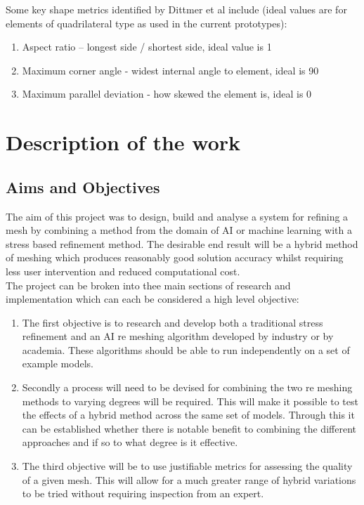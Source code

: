 \documentclass{article}
\begin{document}
\noindent
Some key shape metrics identified by Dittmer et al include (ideal values are for elements of quadrilateral type as used in  the current prototypes):

\begin{enumerate}[label=\Alph*]
\item Aspect ratio – longest side / shortest side, ideal value is 1
\item Maximum corner angle - widest internal angle to element, ideal is 90\degree
\item Maximum parallel deviation - how skewed the element is, ideal is 0\degree
\end{enumerate}

\section{Description of the work}
\subsection{Aims and Objectives}
The aim of this project was to design, build and analyse a system for refining a mesh by combining a method from the domain of AI or machine learning with a stress based refinement method. The desirable end result will be a hybrid method of meshing which produces reasonably good solution accuracy whilst requiring less user intervention and reduced computational cost.\\

\noindent
The project can be broken into thee main sections of research and implementation which can each be considered a high level objective:\\ 

\begin{enumerate}[label=\Alph*]

\item The first objective is to research and develop both a traditional stress refinement and an AI re meshing algorithm developed by industry or by academia. These algorithms should be able to run independently on a set of example models.

\item Secondly a process will need to be devised for combining the two re meshing methods to varying degrees will be required. This will make it possible to test the effects of a hybrid method across the same set of models. Through this it can be established whether there is notable benefit to combining the different approaches and if so to what degree is it effective.

\item The third objective will be to use justifiable metrics for assessing the quality of a given mesh. This will allow for a much greater range of hybrid variations to be tried without requiring inspection from an expert. 
\end{enumerate}
\end{document}
